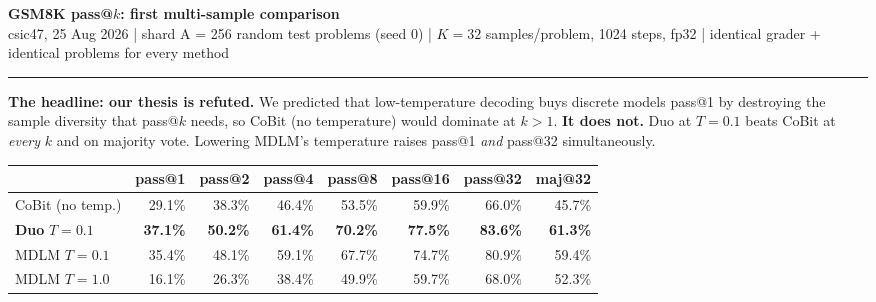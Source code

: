 \documentclass[10pt,a4paper]{article}
\begin{document}
{\LARGE\bfseries GSM8K pass@$k$: first multi-sample comparison}\\[2pt]
{\small csic47, 25 Aug 2026 \;|\; shard A = 256 random test problems (seed 0) \;|\; $K{=}32$ samples/problem,
1024 steps, fp32 \;|\; identical grader + identical problems for every method}

\vspace{4pt}\hrule\vspace{6pt}

{\large\bfseries The headline: our thesis is refuted.}
We predicted that low-temperature decoding buys discrete models pass@1 by destroying the sample
diversity that pass@$k$ needs, so CoBit (no temperature) would dominate at $k>1$.
\textcolor{red!70!black}{\textbf{It does not.}} Duo at $T{=}0.1$ beats CoBit at \emph{every} $k$
and on majority vote. Lowering MDLM's temperature raises pass@1 \emph{and} pass@32 simultaneously.

\vspace{4pt}
\begin{center}\small
\begin{tabular}{@{}lrrrrrrr@{}}
\toprule
& pass@1 & pass@2 & pass@4 & pass@8 & pass@16 & \textbf{pass@32} & maj@32 \\ \midrule
CoBit (no temp.)      & 29.1\% & 38.3\% & 46.4\% & 53.5\% & 59.9\% & 66.0\% & 45.7\% \\
\textbf{Duo} $T{=}0.1$& \textbf{37.1\%} & \textbf{50.2\%} & \textbf{61.4\%} & \textbf{70.2\%} & \textbf{77.5\%} & \textbf{83.6\%} & \textbf{61.3\%} \\
MDLM $T{=}0.1$        & 35.4\% & 48.1\% & 59.1\% & 67.7\% & 74.7\% & 80.9\% & 59.4\% \\
MDLM $T{=}1.0$        & 16.1\% & 26.3\% & 38.4\% & 49.9\% & 59.7\% & 68.0\% & 52.3\% \\
\bottomrule
\end{tabular}
\end{center}

\begin{center}
\end{center}
\end{document}
